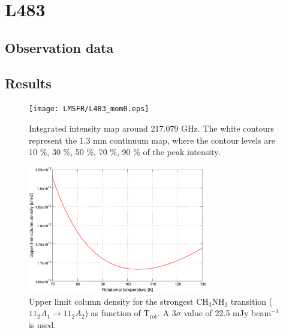 
\section{L483}
\subsection{Observation data}
\subsection{Results}

\begin{figure}[htbp]
  \centering
  \texttt{[image: LMSFR/L483\_mom0.eps]}
  \caption{Integrated intensity map around 217.079 GHz. The white contours represent the 1.3 mm continuum map, where the contour levels are 10 \%, 30 \%, 50 \%, 70 \%, 90 \% of the peak intensity.}
  \label{L483_mom0}
\end{figure}

\begin{figure}[htbp]
  \centering
  \includegraphics[width=0.7\textwidth]{LMSFR/L483.eps}
  \caption{Upper limit column density for the strongest CH$_{3}$NH$_{2}$ transition
  ($11_{2}A_{1} \rightarrow 11_{2}A_{2}$) as function of T$_{\textrm{rot}}$. A 3$\sigma$ value of 
  22.5 mJy beam$^{-1}$ is used.}
  \label{L483_MA}
\end{figure}



